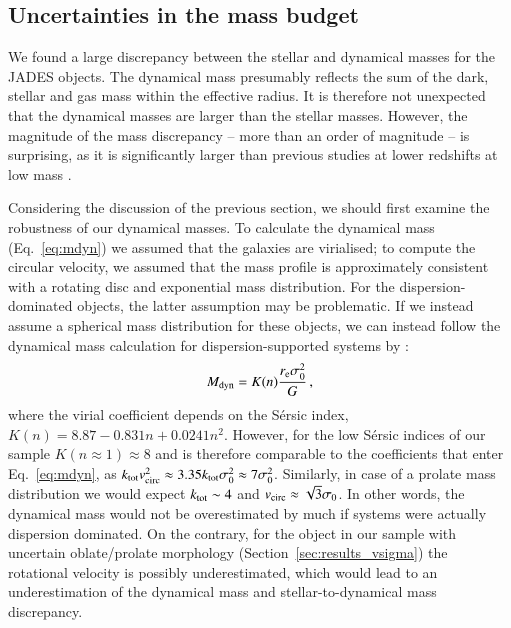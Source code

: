 \documentclass[longauth]{aa}
\newcommand{\re}{r_{\rm e}}
\newcommand{\vc}{v_{\rm circ}}
\newcommand{\vdisp}{\sigma_0}
\newcommand{\Mdyn}{M_{\rm dyn}}
\begin{document}
\subsection{Uncertainties in the mass budget}\label{sec:mass_budget}


We found a large discrepancy between the stellar and dynamical masses for the JADES objects. The dynamical mass presumably reflects the sum of the dark, stellar and gas mass within the effective radius. It is therefore not unexpected that the dynamical masses are larger than the stellar masses. However, the magnitude of the mass discrepancy -- more than an order of magnitude -- is surprising, as it is significantly larger than previous studies at lower redshifts at low mass \citep[e.g.,][]{Maseda2013}.

Considering the discussion of the previous section, we should first examine the robustness of our dynamical masses. To calculate the dynamical mass (Eq.~\ref{eq:mdyn}) we assumed that the galaxies are virialised; to compute the circular velocity, we assumed that the mass profile is approximately consistent with a rotating disc and exponential mass distribution. For the dispersion-dominated objects, the latter assumption may be problematic. If we instead assume a spherical mass distribution for these objects, we can instead follow the dynamical mass calculation for dispersion-supported systems by \citet{Cappellari2006}:
\begin{equation}
    \Mdyn = K(n)\frac{\re\sigma_0^2}{G}\,,
    \label{eq:mdyn_capp}
\end{equation}
where the virial coefficient depends on the S\'ersic index, $K(n) = 8.87 - 0.831n + 0.0241n^2$. However, for the low S\'ersic indices of our sample $K(n\approx1)\approx 8$ and is therefore comparable to the coefficients that enter Eq.~\ref{eq:mdyn}, as $k_{\rm tot}\vc^2 \approx 3.35 k_{\rm tot} \vdisp^2 \approx 7\vdisp^2$. {Similarly, in case of a prolate mass distribution we would expect $k_{\rm tot}\sim 4$ \citep{Price2022} and $\vc\approx\sqrt{3}\vdisp$}. In other words, the dynamical mass would not be overestimated by much if systems were actually dispersion dominated. {On the contrary, for the object in our sample with uncertain oblate/prolate morphology (Section~\ref{sec:results_vsigma}) the rotational velocity is possibly underestimated, which would lead to an underestimation of the dynamical mass and stellar-to-dynamical mass discrepancy. }
\end{document}
